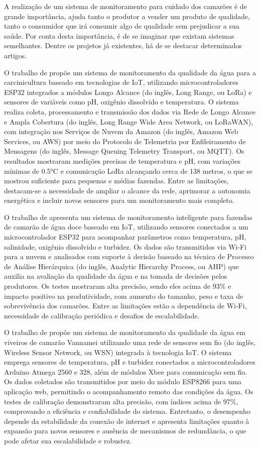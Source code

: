 A realização de um sistema de monitoramento para cuidado dos camarões é de grande importância, ajuda tanto o produtor a vender um produto de qualidade, tanto o consumidor que irá consumir algo de qualidade sem prejudicar a sua saúde. Por conta desta importância, é de se imaginar que existam sistemas semelhantes. Dentre os projetos já existentes, há de se destacar determinados artigos.

O trabalho de \cite{dantas2020} propõe um sistema de monitoramento da qualidade da água para a carcinicultura baseado em tecnologias de IoT, utilizando microcontroladores ESP32 integrados a módulos Longo Alcance (do inglês, Long Range, ou LoRa) e sensores de variáveis como pH, oxigênio dissolvido e temperatura. O sistema realiza coleta, processamento e transmissão dos dados via Rede de Longo Alcance e Ampla Cobertura (do inglês, Long Range Wide Area Network, ou LoRaWAN), com integração nos Serviços de Nuvem da Amazon (do inglês, Amazon Web Services, ou AWS) por meio do Protocolo de Telemetria por Enfileiramento de Mensagens (do inglês, Message Queuing Telemetry Transport, ou MQTT). Os resultados mostraram medições precisas de temperatura e pH, com variações mínimas de 0.5°C e comunicação LoRa alcançando cerca de 138 metros, o que se mostrou suficiente para pequenas e médias fazendas. Entre as limitações, destacam-se a necessidade de ampliar o alcance da rede, aprimorar a autonomia energética e incluir novos sensores para um monitoramento mais completo.

O trabalho de \cite{Uddin2020} apresenta um sistema de monitoramento inteligente para fazendas de camarão de água doce baseado em IoT, utilizando sensores conectados a um microcontrolador ESP32 para acompanhar parâmetros como temperatura, pH, salinidade, oxigênio dissolvido e turbidez. Os dados são transmitidos via Wi-Fi para a nuvem e analisados com suporte à decisão baseado na técnica de Processo de Análise Hierárquica (do inglês, Analytic Hierarchy Process, ou AHP) que auxilia na avaliação da qualidade da água e na tomada de decisões pelos produtores. Os testes mostraram alta precisão, sendo eles acima de 93\% e impacto positivo na produtividade, com aumento do tamanho, peso e taxa de sobrevivência dos camarões. Entre as limitações estão a dependência de Wi-Fi, necessidade de calibração periódica e desafios de escalabilidade.

O trabalho de \cite{Zainuddin2019} propõe um sistema de monitoramento da qualidade da água em viveiros de camarão Vannamei utilizando uma rede de sensores sem fio (do inglês, Wireless Sensor Network, ou WSN) integrada à tecnologia IoT. O sistema emprega sensores de temperatura, pH e turbidez conectados a microcontroladores Arduino Atmega 2560 e 328, além de módulos Xbee para comunicação sem fio. Os dados coletados são transmitidos por meio do módulo ESP8266 para uma aplicação web, permitindo o acompanhamento remoto das condições da água. Os testes de calibração demonstraram alta precisão, com índices acima de 97\%, comprovando a eficiência e confiabilidade do sistema. Entretanto, o desempenho depende da estabilidade da conexão de internet e apresenta limitações quanto à expansão para novos sensores e ausência de mecanismos de redundância, o que pode afetar sua escalabilidade e robustez.

